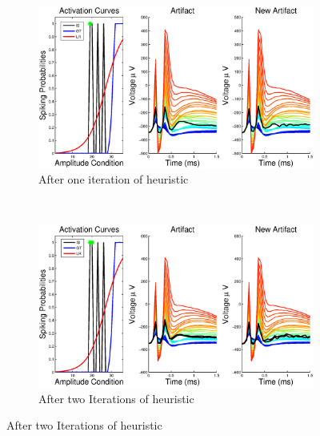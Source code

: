\documentclass[12pt,letterpaper,fleqn]{article}
\begin{document}
\begin{figure}[ht!]
        \begin{subfigure}[b]{0.5\textwidth}
                \includegraphics[width=\textwidth]{i2.eps}
                \caption{After one iteration of heuristic}
        \end{subfigure}~
         \begin{subfigure}[b]{0.5\textwidth}
                \includegraphics[width=\textwidth]{i3.eps}
                \caption{After two Iterations of heuristic}
                \label{fig:mouse}
        \end{subfigure}
        

\end{figure}
\end{document}
